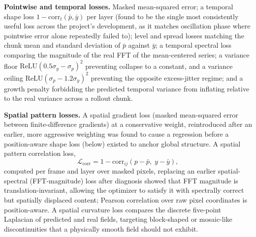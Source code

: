 \documentclass[11pt]{article}
\begin{document}
\textbf{Pointwise and temporal losses.} Masked mean-squared error; a temporal shape loss $1-\mathrm{corr}_t(\bar p,\bar y)$ per layer (found to be the single most consistently useful loss across the project's development, as it matches oscillation phase where pointwise error alone repeatedly failed to); level and spread losses matching the chunk mean and standard deviation of $\bar p$ against $\bar y$; a temporal spectral loss comparing the magnitude of the real FFT of the mean-centered series; a variance floor $\mathrm{ReLU}(0.5\sigma_y-\sigma_p)^2$ preventing collapse to a constant, and a variance ceiling $\mathrm{ReLU}(\sigma_p-1.2\sigma_y)^2$ preventing the opposite excess-jitter regime; and a growth penalty forbidding the predicted temporal variance from inflating relative to the real variance across a rollout chunk.

\textbf{Spatial pattern losses.} A spatial gradient loss (masked mean-squared error between finite-difference gradients) at a conservative weight, reintroduced after an earlier, more aggressive weighting was found to cause a regression before a position-aware shape loss (below) existed to anchor global structure. A spatial pattern correlation loss,
\begin{equation}
\mathcal{L}_{\mathrm{corr}} = 1-\mathrm{corr}_{ij}(p-\bar p,\;y-\bar y),
\label{eq:spatialcorr}
\end{equation}
computed per frame and layer over masked pixels, replacing an earlier spatial-spectral (FFT-magnitude) loss after diagnosis showed that FFT magnitude is translation-invariant, allowing the optimizer to satisfy it with spectrally correct but spatially displaced content; Pearson correlation over raw pixel coordinates is position-aware. A spatial curvature loss compares the discrete five-point Laplacian of predicted and real fields, targeting block-shaped or mosaic-like discontinuities that a physically smooth field should not exhibit.
\end{document}

